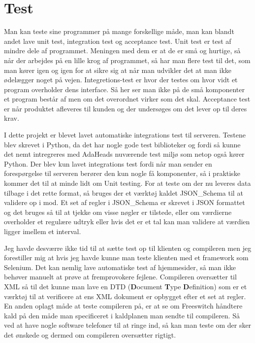 \chapter{Test}
Man kan teste sine programmer på mange forskellige måde, man kan blandt andet lave unit test, integration test og acceptance test. Unit test er test af mindre dele af programmet. Meningen med dem er at de er små og hurtige, så når der arbejdes på en lille krog af programmet, så har man flere test til det, som man kører igen og igen for at sikre sig at når man udvikler det at man ikke ødelægger noget på vejen\citep{osherove2010artofunittesting}.
Integretions-test er hvor der testes om hvor vidt et program overholder dens interface. Så her ser man ikke på de små komponenter et program består af men om det overordnet virker som det skal.
Acceptance test er når produktet afleveres til kunden og der undersøges om det lever op til deres krav.

I dette projekt er blevet lavet automatiske integrations test til serveren. Testene blev skrevet i Python, da det har nogle gode test biblioteker og fordi så kunne det nemt intregreres med AdaHeads nuværende test miljø som netop også kører Python. Der blev kun lavet integrations test fordi når man sender en forespørgelse til serveren berører den kun nogle få komponenter, så i praktiske kommer det til at minde lidt om Unit testing.
For at teste om der nu leveres data tilbage i det rette format, så bruges der et værktøj kaldet JSON\_Schema til at validere op i mod. Et set af regler i JSON\_Schema er skrevet i JSON formattet og det bruges så til at tjekke om visse nøgler er tilstede, eller om værdierne overholder et regulære udtryk eller hvis det er et tal kan man validere at værdien ligger imellem et interval.

Jeg havde desværre ikke tid til at sætte test op til klienten og compileren men jeg forestiller mig at hvis jeg havde kunne man teste klienten med et framework som Selenium. Det kan nemlig lave automatiske test af hjemmesider, så man ikke behøver manuelt at prøve at fremprovokere fejlene. Compileren oversætter til XML så til det kunne man lave en DTD (\textbf{D}ocument \textbf{T}ype \textbf{D}efinition) som er et værktøj til at verificere at ens XML dokument er opbygget efter et set at regler. En anden oplagt måde at teste compileren på, er at se om Freeswitch håndtere kald på den måde man specificeret i kaldplanen man sendte til compileren. Så ved at have nogle software telefoner til at ringe ind, så kan man teste om der sker det ønskede og dermed om compileren oversætter rigtigt. 
